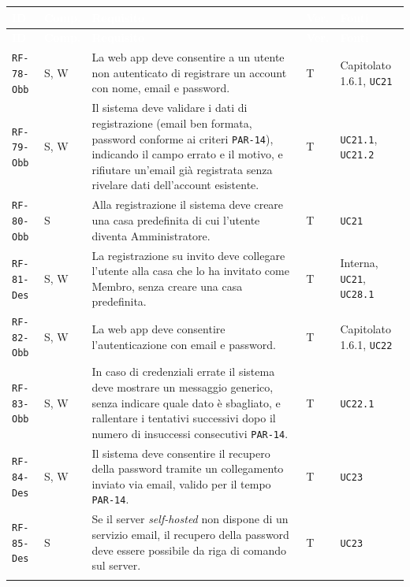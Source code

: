\documentclass[12pt,a4paper]{article}
\newcommand{\thc}[1]{\textcolor{white}{\textbf{#1}}}
\newcommand{\rl}{\\ \arrayrulecolor{bfline}\hline}
\begin{document}
\begin{longtable}{>{\raggedright\arraybackslash}p{}>{\centering\arraybackslash}p{}>{\raggedright\arraybackslash}p{}>{\centering\arraybackslash}p{}>{\raggedright\arraybackslash}p{}}
\rowcolor{bfblue}\thc{ID} & \thc{Comp.} & \thc{Requisito} & \thc{Ver.} & \thc{Fonti} \\ \endfirsthead
\rowcolor{bfblue}\thc{ID} & \thc{Comp.} & \thc{Requisito} & \thc{Ver.} & \thc{Fonti} \\ \endhead
\texttt{RF-78-Obb} & S, W & La web app deve consentire a un utente non autenticato di registrare un account con nome, email e password. & T & Capitolato 1.6.1, \texttt{UC21} \rl

\texttt{RF-79-Obb} & S, W & Il sistema deve validare i dati di registrazione (email ben formata, password conforme ai criteri \texttt{PAR-14}), indicando il campo errato e il motivo, e rifiutare un'email già registrata senza rivelare dati dell'account esistente. & T & \texttt{UC21.1}, \texttt{UC21.2} \rl

\texttt{RF-80-Obb} & S & Alla registrazione il sistema deve creare una casa predefinita di cui l'utente diventa Amministratore. & T & \texttt{UC21} \rl

\texttt{RF-81-Des} & S, W & La registrazione su invito deve collegare l'utente alla casa che lo ha invitato come Membro, senza creare una casa predefinita. & T & Interna, \texttt{UC21}, \texttt{UC28.1} \rl

\texttt{RF-82-Obb} & S, W & La web app deve consentire l'autenticazione con email e password. & T & Capitolato 1.6.1, \texttt{UC22} \rl

\texttt{RF-83-Obb} & S, W & In caso di credenziali errate il sistema deve mostrare un messaggio generico, senza indicare quale dato è sbagliato, e rallentare i tentativi successivi dopo il numero di insuccessi consecutivi \texttt{PAR-14}. & T & \texttt{UC22.1} \rl

\texttt{RF-84-Des} & S, W & Il sistema deve consentire il recupero della password tramite un collegamento inviato via email, valido per il tempo \texttt{PAR-14}. & T & \texttt{UC23} \rl

\texttt{RF-85-Des} & S & Se il server \emph{self-hosted} non dispone di un servizio email, il recupero della password deve essere possibile da riga di comando sul server. & T & \texttt{UC23} \rl


\end{longtable}
\end{document}
